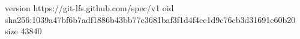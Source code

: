 version https://git-lfs.github.com/spec/v1
oid sha256:1039a47bf6b7adf1886b43bb77c3681baf3f1d4f4cc1d9c76cb3d31691e60b20
size 43840
